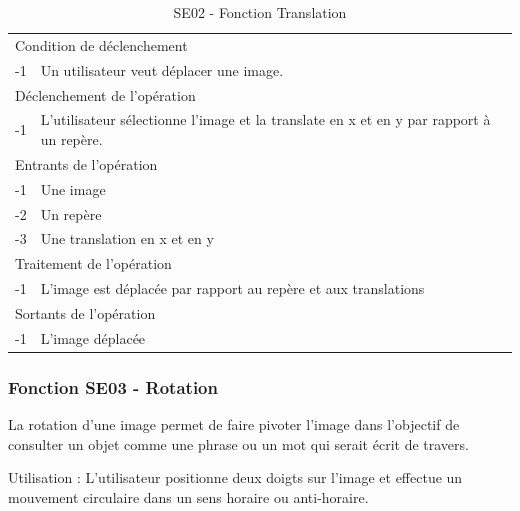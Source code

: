 \documentclass[a4paper]{article}
\begin{document}
\begin{table}[H]
  \centering
   \small
	\begin{tabular}{|c|p{12cm}|}
   		\hline
   			\rowcolor{lightgray}\multicolumn{2}{|c|}{\textbf{SE02 - Fonction Translation}} \\
   		\hline
   			\multicolumn{2}{|l|}{Condition de d\'eclenchement} \\
   		\hline
   			-1 & Un utilisateur veut déplacer une image. \\
   		\hline
   			\multicolumn{2}{|l|}{D\'eclenchement de l'op\'eration} \\
   		\hline
   			-1 & L'utilisateur sélectionne l'image et la translate en x et en y par rapport à un repère. \\
   		\hline
   			\multicolumn{2}{|l|}{Entrants de l'op\'eration} \\
   		\hline
        	-1 & Une image \\
   			-2 & Un repère \\
        	-3 & Une translation en x et en y \\ 	
        \hline
   			\multicolumn{2}{|l|}{Traitement de l'op\'eration} \\
  		\hline
   			-1 & L'image est déplacée par rapport au repère et aux translations \\
   		\hline
   			\multicolumn{2}{|l|}{Sortants de l'op\'eration} \\
   		\hline
   			-1 & L'image déplacée \\
   		\hline
	\end{tabular}
  \caption{SE02 - Fonction Translation}
  \normalsize
  \label{tab:visu_img_translation}
\end{table}

\subsubsection{Fonction SE03 - Rotation}

La rotation d'une image permet de faire pivoter l'image dans l'objectif de consulter un objet comme une phrase ou un mot qui serait écrit de travers.

Utilisation : L'utilisateur positionne deux doigts sur l'image et effectue un mouvement circulaire dans un sens horaire ou anti-horaire.
\end{document}
